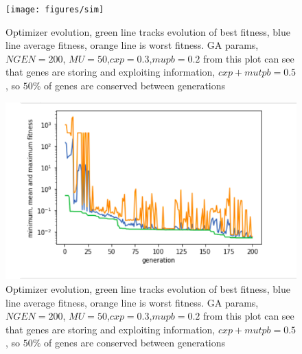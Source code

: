 \begin{figure}
    \centering
    \texttt{[image: figures/sim]}
    \caption{Optimizer evolution, green line tracks evolution of best fitness, blue line average fitness, orange line is worst fitness. GA params, $NGEN=200$, $MU=50$,$cxp=0.3$,$mupb=0.2$ from this plot can see that genes are storing and exploiting information, $cxp+mutpb=0.5$, so $50\%$ of genes are conserved between generations }
    \label{fig:my_label}
\end{figure}

\begin{figure}
    \centering
    \includegraphics[scale=0.7]{figures/optimizer_internal_validation}
    \caption{Optimizer evolution, green line tracks evolution of best fitness, blue line average fitness, orange line is worst fitness. GA params, $NGEN=200$, $MU=50$,$cxp=0.3$,$mupb=0.2$ from this plot can see that genes are storing and exploiting information, $cxp+mutpb=0.5$, so $50\%$ of genes are conserved between generations }
    \label{fig:my_label}
\end{figure}


\begin{table}[ht]
\centering
{}
\end{table}

